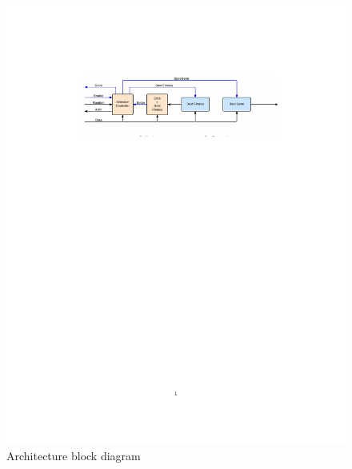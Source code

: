 \begin{figure}

  \centering
  \includegraphics[trim=5cm 20cm 1cm 1cm, clip=true ]{fpga/fig/data_path_selection_core.pdf}
  \caption{Architecture block diagram}
  \label{fpga:fig:selection:selection_core_data_path}
\end{figure}
